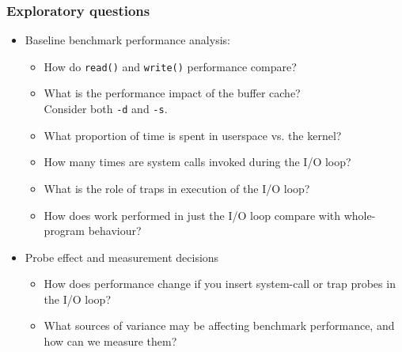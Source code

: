 \begin{frame}
  \frametitle{Exploratory questions}

  \begin{itemize}
    \item Baseline benchmark performance analysis:
    \begin{itemize}
      \item How do \texttt{read()} and \texttt{write()} performance compare?
      \item What is the performance impact of the buffer cache? \\
	Consider both \texttt{-d} and \texttt{-s}.
      \item What proportion of time is spent in userspace vs. the kernel?
      \item How many times are system calls invoked during the I/O loop?
      \item What is the role of traps in execution of the I/O loop?
      \item How does work performed in just the I/O loop compare with
	whole-program behaviour?
    \end{itemize}

    \pause
    \bigskip

    \item Probe effect and measurement decisions
    \begin{itemize}
      \item How does performance change if you insert system-call or trap
	probes in the I/O loop?
      \item What sources of variance may be affecting benchmark performance,
	and how can we measure them?
    \end{itemize}
  \end{itemize}
\end{frame}


